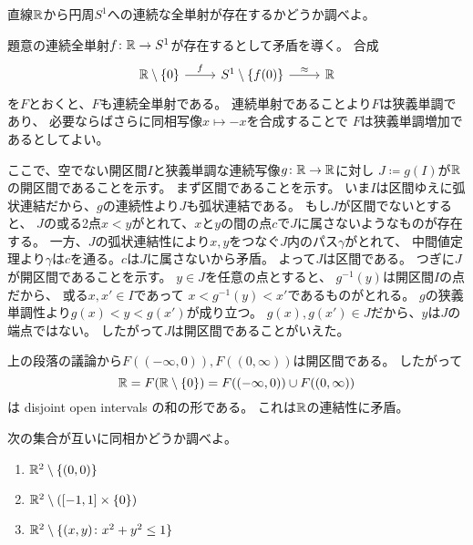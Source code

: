 \documentclass[report]{jlreq}
\begin{document}
\begin{problem}[幾何学II 1.3]
    直線$\mathbb{R}$から円周$S^1$への連続な全単射が存在するかどうか調べよ。
\end{problem}

\begin{answer}
    題意の連続全単射$f \colon \mathbb{R} \to S^1$が存在するとして矛盾を導く。
    合成
    \begin{equation}
        \begin{tikzcd}
            \R \setminus \{0\} \ar{r}{f}
                & S^1 \setminus \{f(0)\} \ar{r}{\approx}
                & \R
        \end{tikzcd}
    \end{equation}
    を$F$とおくと、$F$も連続全単射である。
    連続単射であることより$F$は狭義単調であり、
    必要ならばさらに同相写像$x \mapsto -x$を合成することで
    $F$は狭義単調増加であるとしてよい。

    ここで、空でない開区間$I$と狭義単調な連続写像$g \colon \mathbb{R} \to \mathbb{R}$に対し
    $J \coloneqq g(I)$が$\mathbb{R}$の開区間であることを示す。
    まず区間であることを示す。
    いま$I$は区間ゆえに弧状連結だから、$g$の連続性より$J$も弧状連結である。
    もし$J$が区間でないとすると、
    $J$の或る2点$x < y$がとれて、$x$と$y$の間の点$c$で$J$に属さないようなものが存在する。
    一方、$J$の弧状連結性により$x, y$をつなぐ$J$内のパス$\gamma$がとれて、
    中間値定理より$\gamma$は$c$を通る。$c$は$J$に属さないから矛盾。
    よって$J$は区間である。
    つぎに$J$が開区間であることを示す。
    $y \in J$を任意の点とすると、
    $g^{-1}(y)$は開区間$I$の点だから、
    或る$x, x' \in I$であって
    $x < g^{-1}(y) < x'$であるものがとれる。
    $g$の狭義単調性より$g(x) < y < g(x')$が成り立つ。
    $g(x), g(x') \in J$だから、$y$は$J$の端点ではない。
    したがって$J$は開区間であることがいえた。

    上の段落の議論から$F((-\infty, 0)), F((0, \infty))$は開区間である。
    したがって
    \begin{equation}
        \mathbb{R} = F(\mathbb{R} \setminus \{0\}) = F((-\infty, 0)) \cup F((0, \infty))
    \end{equation}
    は disjoint open intervals の和の形である。
    これは$\mathbb{R}$の連結性に矛盾。
\end{answer}

\begin{problem}[幾何学II 1.4]
    次の集合が互いに同相かどうか調べよ。
    \begin{enumerate}
        \item $\mathbb{R}^2 \setminus \{(0, 0)\}$
        \item $\mathbb{R}^2 \setminus ([-1, 1] \times \{0\})$
        \item $\mathbb{R}^2 \setminus \{(x, y) \colon x^2 + y^2 \le 1\}$
    \end{enumerate}
\end{problem}
\end{document}
